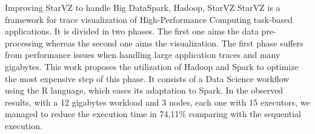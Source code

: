 \begin{abstract}
O StarVZ é um arcabouço para visualização de rastros de aplicações 
orientadas a tarefas no contexto de \textit{High-Performance Computing}. Ele é 
separado em duas fases, a primeira voltada para o pré-processamento dos dados e 
a segunda para a exibição. Essa primeira fase sofre de problemas de desempenho 
ao trabalhar com grandes volumes de dados. Este trabalho se propõe a utilizar o 
Hadoop e o Spark para otimizar o processamento mais custoso desta fase. Este 
consiste em um fluxo de Ciência de Dados utilizando a linguagem R, o que 
facilitou bastante sua portagem para manipulação de dados via Spark. Nos 
resultados observados utilizando uma carga de trabalho de 12 gigabytes e 3 nós 
computacionais, cada um com 15 executores, chegamos a reduzir o tempo de 
execução em 74,11\% comparado com a execução sequencial.
\end{abstract}

\begin{englishabstract}{Improving StarVZ to handle Big Data}{Spark, 
Hadoop, StarVZ}
StarVZ is a framework for trace visualization of High-Performance Computing 
task-based applications. It is divided in two phases. The first one aims the 
data pre-processing whereas the second one aims the visualization. The 
first phase suffers from performance issues when handling large application 
traces and many gigabytes. This work proposes the utilization of Hadoop and 
Spark to optimize the most expensive step of this phase. It consists of a Data 
Science workflow using the R language, which eases its adaptation to Spark. In 
the observed results, with a 12 gigabytes workload and 3 nodes, each one with 
15 executors, we managed to reduce the execution time in 74,11\% comparing with 
the sequential execution.
\end{englishabstract}

